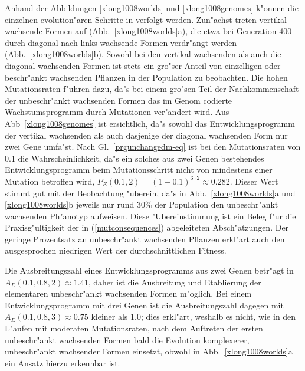 Anhand der Abbildungen \ref{xlong1008worlds} und \ref{xlong1008genomes} k"onnen die einzelnen evolution"aren
Schritte in 
verfolgt werden. Zun"achst treten vertikal wachsende Formen auf (Abb.\ \ref{xlong1008worlds}a), die etwa
bei Generation 400 durch diagonal nach links wachsende Formen verdr"angt werden (Abb.\ \ref{xlong1008worlds}b).
Sowohl bei den vertikal wachsenden als auch die diagonal wachsenden Formen ist stets ein gro"ser Anteil
von einzelligen oder beschr"ankt wachsenden Pflanzen in der Population zu beobachten. Die hohen Mutationsraten
f"uhren dazu, da"s bei einem gro"sen Teil der Nachkommenschaft der unbeschr"ankt wachsenden Formen das im
Genom codierte Wachstumsprogramm durch Mutationen ver"andert wird. Aus Abb\ \ref{xlong1008genomes}
ist ersichtlich, da"s sowohl das Entwicklungsprogramm der vertikal wachsenden als auch dasjenige
der diagonal wachsenden Form nur zwei Gene umfa"st. Nach Gl.\ \ref{prgunchangedm-eq}
ist bei den Mutationsraten von 0.1 die Wahrscheinlichkeit, da"s ein solches aus zwei Genen bestehendes
Entwicklungsprogramm beim Mutationsschritt nicht von mindestens einer Mutation betroffen wird,
$P_E(0.1,2) = (1 - 0.1)^{6 \cdot 2} \approx 0.282$. Dieser Wert stimmt gut mit der Beobachtung "uberein, da"s in
Abb.\ \ref{xlong1008worlds}a und \ref{xlong1008worlds}b jeweils nur rund 30\% der Population den
unbeschr"ankt wachsenden Ph"anotyp aufweisen. Diese "Ubereinstimmung ist ein Beleg f"ur die Praxisg"ultigkeit
der in (\ref{mutconsequences}) abgeleiteten Absch"atzungen. Der geringe Prozentsatz an unbeschr"ankt wachsenden Pflanzen
erkl"art auch den ausgesprochen niedrigen Wert der durchschnittlichen
Fitness.

\begin{sloppypar}
Die Ausbreitungszahl eines Entwicklungsprogramms aus zwei Genen betr"agt in 
$A_E(0.1,0.8,2) \approx 1.41$, daher ist die Ausbreitung und Etablierung der elementaren unbeschr"ankt
wachsenden Formen m"oglich. Bei einem Entwicklungsprogramm mit drei Genen ist die Ausbreitungszahl dagegen
mit $A_E(0.1, 0.8, 3) \approx 0.75$ kleiner als 1.0; dies erkl"art, weshalb es nicht, wie in den L"aufen mit
moderaten Mutationsraten, nach dem Auftreten der ersten unbeschr"ankt wachsenden Formen bald die Evolution
komplexerer, unbeschr"ankt wachsender Formen einsetzt, obwohl
in Abb.\ \ref{xlong1008worlds}a ein Ansatz hierzu erkennbar ist.
\end{sloppypar}

